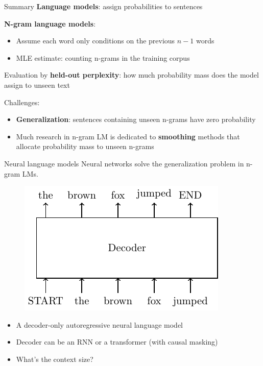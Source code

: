 \documentclass[usenames,dvipsnames,notes,11pt,aspectratio=169,hyperref={colorlinks=true, linkcolor=blue}]{beamer}
\begin{document}
\begin{frame}
    {Summary}
    \textbf{Language models}: assign probabilities to sentences
    \pause

    \textbf{N-gram language models}:\\
    \begin{itemize}
        \item Assume each word only conditions on the previous $n-1$ words
        \item MLE estimate: counting n-grams in the training corpus
    \end{itemize}
    \pause

    {Evaluation} by \textbf{held-out perplexity}: how much probability mass does the model assign to unseen text 
    \pause

    Challenges:\\
    \begin{itemize}
        \item \textbf{Generalization}: sentences containing unseen n-grams have zero probability
        \item Much research in n-gram LM is dedicated to \textbf{smoothing} methods that allocate probability mass to unseen n-grams
    \end{itemize}
\end{frame}


\begin{frame}
    {Neural language models}
    Neural networks solve the generalization problem in n-gram LMs.
    \begin{figure}
            \includegraphics[height=0.5\textheight]{figures/decoder}
    \end{figure}
    \begin{itemize}
        \item A decoder-only autoregressive neural language model 
        \item Decoder can be an RNN or a transformer (with causal masking)
        \item What's the context size?
    \end{itemize}
\end{frame}
\end{document}
